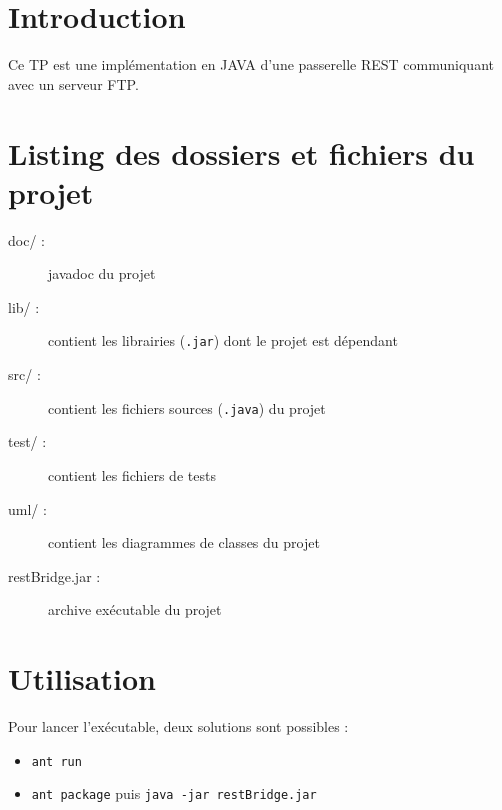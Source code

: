 \section*{Introduction}
Ce TP est une implémentation en JAVA d'une passerelle REST communiquant avec un serveur FTP.

\section*{Listing des dossiers et fichiers du projet}
\begin{description}
	\item[doc/ :] javadoc du projet
	\item[lib/ :] contient les librairies (\verb+.jar+) dont le projet est dépendant
	\item[src/ :] contient les fichiers sources (\verb+.java+) du projet
	\item[test/ :] contient les fichiers de tests
	\item[uml/ :] contient les diagrammes de classes du projet
	\item[restBridge.jar :] archive exécutable du projet
\end{description}

\section*{Utilisation}
	Pour lancer l'exécutable, deux solutions sont possibles :
		\begin{itemize}
			\item \verb+ant run+
			\item \verb+ant package+ puis \verb+java -jar restBridge.jar+ 
		\end{itemize}

